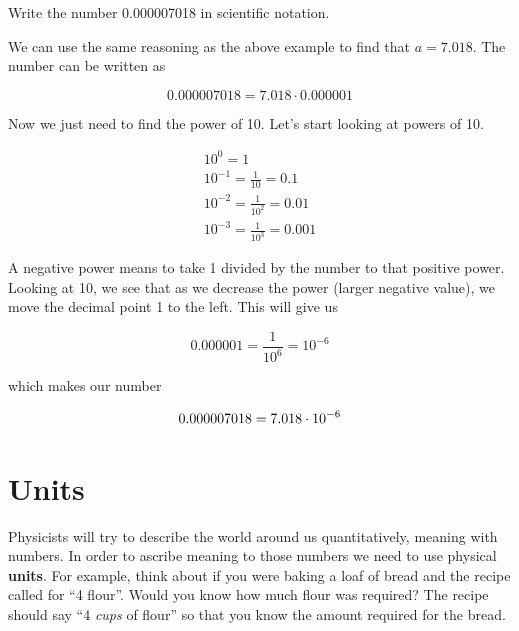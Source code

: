 \documentclass[12pt]{book}
\begin{document}
\begin{exampleblock}

Write the number 0.000007018 in scientific notation.

\hspace{10pt}

We can use the same reasoning as the above example to find that $a = 7.018$. The number can be written as

\begin{equation}
0.000007018 = 7.018 \cdot 0.000001
\end{equation}

Now we just need to find the power of 10. Let's start looking at powers of 10.

\begin{equation}
\begin{split}
10^0 = 1 \\
10^{-1} = \frac{1}{10} = 0.1 \\
10^{-2} = \frac{1}{10^2} = 0.01 \\
10^{-3} = \frac{1}{10^3} = 0.001
\end{split}
\end{equation}

A negative power means to take 1 divided by the number to that positive power. Looking at 10, we see that as we decrease the power (larger negative value), we move the decimal point 1 to the left. This will give us

\begin{equation}
0.000001 = \frac{1}{10^6} = 10^{-6}
\end{equation}

which makes our number

\begin{equation}
0.000007018 = 7.018 \cdot 10^{-6}
\end{equation}

\end{exampleblock}

\section{Units}

Physicists will try to describe the world around us quantitatively, meaning with numbers. In order to ascribe meaning to those numbers we need to use physical \textbf{units}. For example, think about if you were baking a loaf of bread and the recipe called for ``4 flour''. Would you know how much flour was required? The recipe should say ``4 \textit{cups} of flour'' so that you know the amount required for the bread. 
\end{document}
